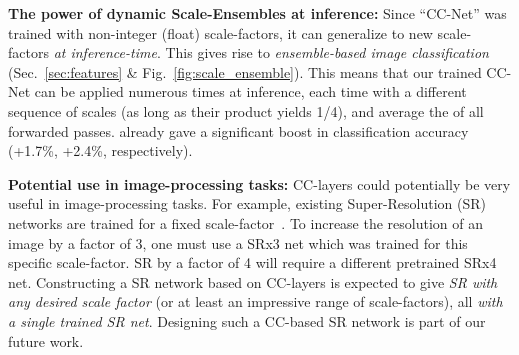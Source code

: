 \textbf{The power of dynamic Scale-Ensembles at inference:}
Since  ``CC-Net'' was trained with non-integer (float)  scale-factors, it can generalize to new  scale-factors \emph{at inference-time}. This gives rise to \emph{ensemble-based image classification} (Sec.~\ref{sec:features} \& Fig.~\ref{fig:scale_ensemble}). 
This means that our trained CC-Net can be applied numerous times at inference, each time with a different sequence of scales (as long as their product yields 1/4), and average the 
of all forwarded passes.
already gave a significant boost in classification accuracy (+1.7\%, +2.4\%, respectively).
%

\textbf{Potential use in image-processing tasks:}
CC-layers could potentially be very useful in image-processing tasks. For example, existing Super-Resolution (SR) networks are trained for a fixed scale-factor~\cite{EDSR, srcnn}. To increase the resolution of an image by a factor of 3, one must use a SRx3 net which was trained for this specific scale-factor. SR by a factor of 4 will require a different pretrained SRx4  net. 
Constructing a SR network based on CC-layers is expected to give \emph{SR with any desired scale factor} (or at least an impressive range of scale-factors), all \emph{with a single trained SR net}. 
Designing such a CC-based SR network is part of our future work.
